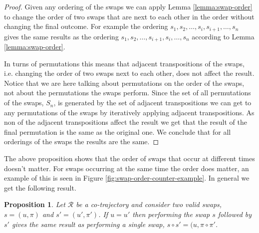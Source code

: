 \documentclass[12pt]{article}
\newcommand{\cotraj}{\mathcal{R}}
\newcommand{\swap}{s}
\newcommand{\swaptime}{u}
\newtheorem{proposition}{Proposition}
\theoremstyle{definition}
\begin{document}
\begin{proof}
  Given any ordering of the swaps we can apply Lemma
  \ref{lemma:swap-order} to change the order of two swaps that are
  next to each other in the order without changing the final outcome.
  For example the ordering
  \(s_{1}, s_{2}, \dots, s_{i}, s_{i + 1}, \dots, s_{n}\) gives the
  same results as the ordering
  \(s_{1}, s_{2}, \dots, s_{i + 1}, s_{i}, \dots, s_{n}\) according to
  Lemma \ref{lemma:swap-order}.

  In turns of permutations this means that adjacent transpositions of
  the swaps, i.e. changing the order of two swaps next to each other,
  does not affect the result. Notice that we are here talking about
  permutations on the order of the swaps, not about the permutations
  the swaps perform. Since the set of all permutations of the swaps,
  \(S_{n}\), is generated by the set of adjacent transpositions we can
  get to any permutations of the swaps by iteratively applying
  adjacent transpositions. As non of the adjacent transpositions
  affect the result we get that the result of the final permutation is
  the same as the original one. We conclude that for all orderings of
  the swaps the results are the same.
\end{proof}

The above proposition shows that the order of swaps that occur at
different times doesn't matter. For swaps occurring at the same time
the order does matter, an example of this is seen in Figure
\ref{fig:swap-order-counter-example}. In general we get the following
result.

\begin{proposition}
  \label{prop:swap-compose}
  Let \(\cotraj\) be a co-trajectory and consider two valid swaps,
  \(\swap = (\swaptime, \pi)\) and \(\swap' = (\swaptime', \pi')\). If
  \(\swaptime = \swaptime'\) then performing the swap \(\swap\)
  followed by \(\swap'\) gives the same result as performing a single
  swap, \(\swap \circ \swap' = (\swaptime, \pi \circ \pi'\).
\end{proposition}
\end{document}
